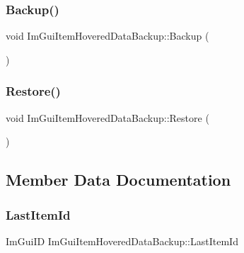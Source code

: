 \subsubsection{\texorpdfstring{Backup()}{Backup()}}
{\footnotesize\ttfamily void Im\+Gui\+Item\+Hovered\+Data\+Backup\+::\+Backup (\begin{DoxyParamCaption}{ }\end{DoxyParamCaption})}

\hypertarget{struct_im_gui_item_hovered_data_backup_a4d807799df14f74bde55482134b076cc}{}\label{struct_im_gui_item_hovered_data_backup_a4d807799df14f74bde55482134b076cc} 
\subsubsection{\texorpdfstring{Restore()}{Restore()}}
{\footnotesize\ttfamily void Im\+Gui\+Item\+Hovered\+Data\+Backup\+::\+Restore (\begin{DoxyParamCaption}{ }\end{DoxyParamCaption})}



\subsection{Member Data Documentation}
\hypertarget{struct_im_gui_item_hovered_data_backup_a5e0b18013d983269deba7976666fc501}{}\label{struct_im_gui_item_hovered_data_backup_a5e0b18013d983269deba7976666fc501} 
\subsubsection{\texorpdfstring{Last\+Item\+Id}{LastItemId}}
{\footnotesize\ttfamily Im\+Gui\+ID Im\+Gui\+Item\+Hovered\+Data\+Backup\+::\+Last\+Item\+Id}

\hypertarget{struct_im_gui_item_hovered_data_backup_ae489c222bed561950104a46ddf1387f3}{}\label{struct_im_gui_item_hovered_data_backup_ae489c222bed561950104a46ddf1387f3} 

